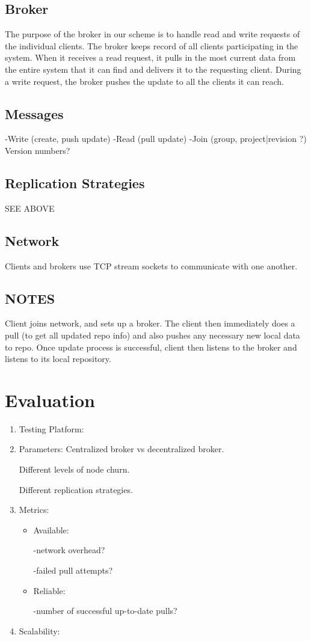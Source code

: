 \subsection{Broker}
The purpose of the broker in our scheme is to handle read and write requests of the individual clients. 
The broker keeps record of all clients participating in the system.
When it receives a read request, it pulls in the most current data from the entire system that it can find
and delivers it to the requesting client.
During a write request, the broker pushes the update to all the clients it can reach.
\subsection{Messages}
-Write (create, push update)
-Read (pull update)
-Join (group, project|revision ?)
Version numbers?
\subsection{Replication Strategies}
SEE ABOVE
\subsection{Network}
Clients and brokers use TCP stream sockets to communicate with one another.
\subsection{NOTES}
Client joins network, and sets up a broker. The client then immediately does a pull (to get all updated repo info) and also pushes any necessary new local data to repo.
Once update process is successful, client then listens to the broker and listens to its local repository.

\section{Evaluation}
\begin{enumerate}
\item Testing Platform:
\item Parameters:
Centralized broker vs decentralized broker.

Different levels of node churn.

Different replication strategies.
\item Metrics:
\begin{itemize}
\item Available:

-network overhead?

-failed pull attempts?
\item Reliable:

-number of successful up-to-date pulls?
\end{itemize}
\item Scalability:
\end{enumerate}

